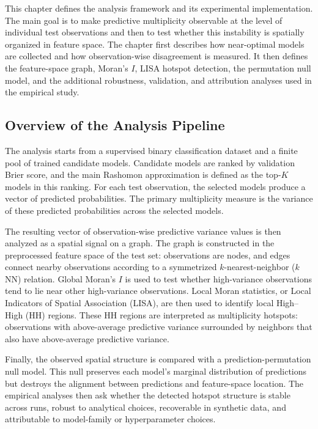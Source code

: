 This chapter defines the analysis framework and its experimental implementation. The
main goal is to make predictive multiplicity observable at the level of individual test
observations and then to test whether this instability is spatially organized in feature
space. The chapter first describes how near-optimal models are collected and how
observation-wise disagreement is measured. It then defines the feature-space graph,
Moran's $I$, LISA hotspot detection, the permutation null model, and the additional
robustness, validation, and attribution analyses used in the empirical study.

\subsection{Overview of the Analysis Pipeline}
\label{sec:framework-overview}

The analysis starts from a supervised binary classification dataset and a finite pool of
trained candidate models. Candidate models are ranked by validation Brier score, and the
main Rashomon approximation is defined as the top-$K$ models in this ranking. For each
test observation, the selected models produce a vector of predicted probabilities. The
primary multiplicity measure is the variance of these predicted probabilities across the
selected models.

The resulting vector of observation-wise predictive variance values is then analyzed as a
spatial signal on a graph. The graph is constructed in the preprocessed feature space of
the test set: observations are nodes, and edges connect nearby observations according to a
symmetrized $k$-nearest-neighbor ($k$NN) relation. Global Moran's $I$ is used to test
whether high-variance observations tend to lie near other high-variance observations.
Local Moran statistics, or Local Indicators of Spatial Association (LISA), are then used
to identify local High--High (HH) regions. These HH regions are interpreted as
multiplicity hotspots: observations with above-average predictive variance surrounded by
neighbors that also have above-average predictive variance.

Finally, the observed spatial structure is compared with a prediction-permutation null
model. This null preserves each model's marginal distribution of predictions but destroys
the alignment between predictions and feature-space location. The empirical analyses then
ask whether the detected hotspot structure is stable across runs, robust to analytical
choices, recoverable in synthetic data, and attributable to model-family or
hyperparameter choices.

